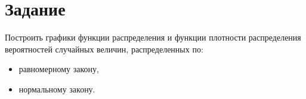 \chapter*{Задание}

Построить графики функции распределения и функции плотности распределения вероятностей
случайных величин, распределенных по:

\begin{itemize}[label=---]
    \item равномерному закону,
    \item нормальному закону.
\end{itemize}

